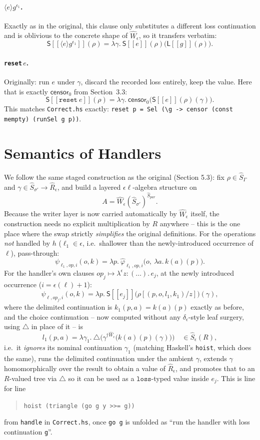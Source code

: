 \documentclass[11pt]{article}
\theoremstyle{plain}
\newcommand{\Ssem}[1]{\mathsf{S}[\![#1]\!]}
\newcommand{\Lsem}[1]{\mathsf{L}[\![#1]\!]}
\newcommand{\Rm}[1]{\widehat{R}_{#1}}
\newcommand{\Sm}[1]{\widehat{S}_{#1}}
\newcommand{\eps}{\epsilon}
\newcommand{\dg}[1]{^{\dagger #1}}
\newcommand{\op}{\mathit{op}}
\newcommand{\loc}[1]{\langle #1 \rangle} %
\newcommand{\censor}{\mathsf{censor}_0}
\newcommand{\collect}{\triangle}
\begin{document}
\paragraph{$\loc{e}g^{\eps_1}$.} Exactly as in the original, this clause only substitutes a
different loss continuation and is oblivious to the concrete shape of $\widehat W_\eps$, so it
transfers verbatim:
\[
  \Ssem{\loc{e}g^{\eps_1}}(\rho) = \lambda\gamma.\ \Ssem{e}(\rho)\big(\Lsem{g}(\rho)\big).
\]

\paragraph{\texttt{reset}\,$e$.} Originally: run $e$ under $\gamma$, discard the recorded loss
entirely, keep the value. Here that is exactly $\censor$ from Section~3.3:
\[
  \Ssem{\mathtt{reset}\ e}(\rho) = \lambda\gamma.\ \censor\big(\Ssem{e}(\rho)(\gamma)\big).
\]
This matches \texttt{Correct.hs} exactly: \texttt{reset p = Sel (\textbackslash g ->
censor (const mempty) (runSel g p))}.

\section{Semantics of Handlers}

We follow the same staged construction as the original (Section 5.3): fix $\rho\in\Sm\Gamma$
and $\gamma\in\Sm{\sigma'}\to\Rm\eps$, and build a layered $\eps\ell$-algebra structure on
\[
  A = \widehat W_\eps(\Sm{\sigma'})^{\Sm{\mathit{par}}}.
\]
Because the writer layer is now carried automatically by $\widehat W_\eps$ itself, the
construction needs no explicit multiplication by $R$ anywhere -- this is the one place where
the swap strictly \emph{simplifies} the original definitions. For the operations
\emph{not} handled by $h$ ($\ell_1\in\eps$, i.e.\ shallower than the newly-introduced
occurrence of $\ell$), pass-through:
\[
  \psi_{\ell_1,\op,i}(o,k) = \lambda p.\ \widehat\varphi_{\ell_1,\op,i}\big(o,\ \lambda a.\, k(a)(p)\big).
\]
For the handler's own clauses $\op_j\mapsto\lambda^\eps z\!:\!(\dots).\,e_j$, at the newly
introduced occurrence ($i = \eps(\ell)+1$):
\[
  \psi_{\ell,\op_j,i}(o,k) = \lambda p.\ \Ssem{e_j}\big(\rho[(p,o,l_1,k_1)/z]\big)(\gamma),
\]
where the delimited continuation is $k_1(p,a) = k(a)(p)$ exactly as before, and the choice
continuation -- now computed without any $\delta_\eps$-style leaf surgery, using $\collect$ in
place of it -- is
\[
  l_1(p,a) = \lambda\gamma_1.\ \collect\Big(\gamma\dg{\widehat W_\eps}\big(k(a)(p)(\gamma)\big)\Big)
  \quad \in \widehat S_\eps(R),
\]
i.e.\ it \emph{ignores} its nominal continuation $\gamma_1$ (matching Haskell's
\texttt{hoist}, which does the same), runs the delimited continuation under the ambient
$\gamma$, extends $\gamma$ homomorphically over the result to obtain a value of $\Rm\eps$, and
promotes that to an $R$-valued tree via $\collect$ so it can be used as a $\mathtt{loss}$-typed
value inside $e_j$. This is line for line
\begin{quote}
\texttt{hoist (triangle (go g y >>= g))}
\end{quote}
from \texttt{handle} in \texttt{Correct.hs}, once \texttt{go g} is unfolded as ``run the
handler with loss continuation \texttt{g}''.
\end{document}
